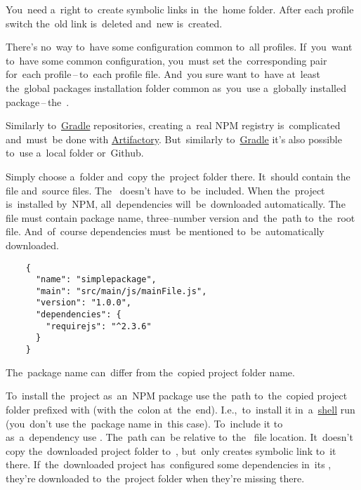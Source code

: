 \warning You~need a~right to~create symbolic links in~the~home folder.
After each profile switch the~old  link is~deleted and~new is~created.

\warning There's no~way to~have some configuration common to~all profiles.
If~you~want to~have some common configuration, you~must set the~corresponding  pair for~each profile\,--\,to~each profile file.
And~you sure want to~have at~least the~global packages installation folder common as~you~use a~globally installed package\,--\,the~.

Similarly to~\hyperref[gradle]{Gradle} repositories, creating a~real NPM registry is~complicated and~must~be done with \href{https://jfrog.com/artifactory/}{Artifactory}.
But~similarly to~\hyperref[gradle]{Gradle} it's also possible to~use a~local folder or~Github.

\label{npmpublishlocal}
Simply choose a~folder and~copy the~project folder there.
It~should contain the~ file and~source files.
The~ doesn't have to~be~included. When the~project is~installed by~NPM, all~dependencies will~be~downloaded automatically.
The~ file must contain package name, three--number version and~the~path to~the~root file.
And~of~course dependencies must~be mentioned to~be~automatically downloaded.

\begin{lstlisting}
    {
      "name": "simplepackage",
      "main": "src/main/js/mainFile.js",
      "version": "1.0.0",
      "dependencies": {
        "requirejs": "^2.3.6"
      }
    }
\end{lstlisting}

\note The~package name can~differ from the~copied project folder name.
\newline

\noindent To~install the~project as~an~NPM package use the~path to~the~copied project folder prefixed with  (with the~colon at~the~end).
I.e.,~to~install it in~a~\hyperref[shellcligui]{shell} run  (you~don't use the~package name in~this case).
To~include it to~ as~a~dependency use .
The~path can~be relative to~the~ file location.
It~doesn't copy the~downloaded project folder to~, but~only creates symbolic link to~it there.
If~the~downloaded project has~configured some dependencies in~its , they're downloaded to~the~project folder when they're missing there.

